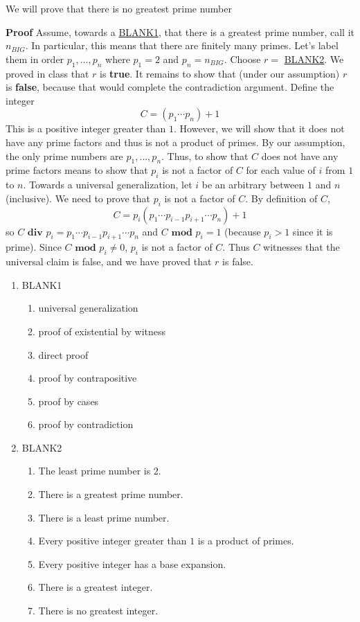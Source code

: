 
We will prove that there is no greatest prime number

{\bf Proof} Assume, towards a \underline{BLANK1}, that 
there is a greatest prime number, call it $n_{BIG}$.
In particular, this means that there are finitely many 
primes. Let's label them in order $p_1, \ldots, p_n$ where 
$p_1 = 2$ and $p_n = n_{BIG}$.
Choose $r = $ \underline{BLANK2}. We proved in class
that $r$ is {\bf true}. It remains to show that (under our 
assumption) $r$ is {\bf false}, because
that would complete the contradiction argument.
Define the integer
\[
    C = (p_1 \cdots p_n) + 1
\]
This is a positive integer greater than $1$. 
However, we will show that it does not have any prime
factors and thus is not a product of primes.
By our assumption, the only prime numbers are $p_1, \ldots, 
p_n$. Thus, to show that $C$ does not have any prime
factors means to show that $p_i$ is not a factor 
of $C$ for each value of $i$ from $1$ to $n$. 
Towards a universal generalization, let $i$ be an arbitrary
between $1$ and $n$ (inclusive). We need to prove that $p_i$ is 
not a factor of $C$. By definition of $C$,
\[
    C = p_i ( p_1 \cdots p_{i-1} p_{i+1} \cdots p_n) + 1
\]
so $C \textbf{ div } p_i = p_1 \cdots p_{i-1} p_{i+1} \cdots p_n$
and $C \textbf{ mod } p_i = 1$ (because $p_i > 1$ since it is prime).
Since $C \textbf{ mod } p_i \neq 0$, $p_i$ is not a factor of $C$.
Thus $C$ witnesses that the universal claim is false, 
and we have proved that $r$ is false.




\begin{enumerate}
\item BLANK1
    \begin{enumerate}
        \item universal generalization
        \item proof of existential by witness
        \item direct proof
        \item proof by contrapositive
        \item proof by cases
        \item proof by contradiction
    \end{enumerate}
\item BLANK2
\begin{enumerate}
    \item The least prime number is $2$.
    \item There is a greatest prime number.
    \item There is a least prime number.
    \item Every positive integer greater than $1$ is a product of primes.
    \item Every positive integer has a base expansion.
    \item There is a greatest integer.
    \item There is no greatest integer.
\end{enumerate}
\end{enumerate}